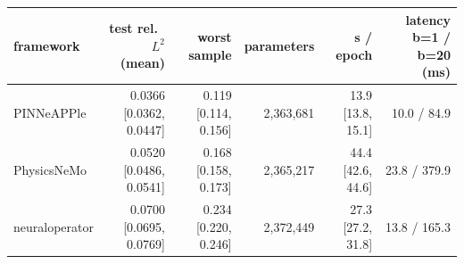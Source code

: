 \begin{tabular}{lrrrrr}
\toprule
framework & test rel.\ $L^2$ (mean) & worst sample & parameters & s / epoch & latency b=1 / b=20 (ms) \\
\midrule
PINNeAPPle & 0.0366 [0.0362, 0.0447] & 0.119 [0.114, 0.156] & 2{,}363{,}681 & 13.9 [13.8, 15.1] & 10.0 / 84.9 \\
PhysicsNeMo & 0.0520 [0.0486, 0.0541] & 0.168 [0.158, 0.173] & 2{,}365{,}217 & 44.4 [42.6, 44.6] & 23.8 / 379.9 \\
neuraloperator & 0.0700 [0.0695, 0.0769] & 0.234 [0.220, 0.246] & 2{,}372{,}449 & 27.3 [27.2, 31.8] & 13.8 / 165.3 \\
\bottomrule
\end{tabular}
